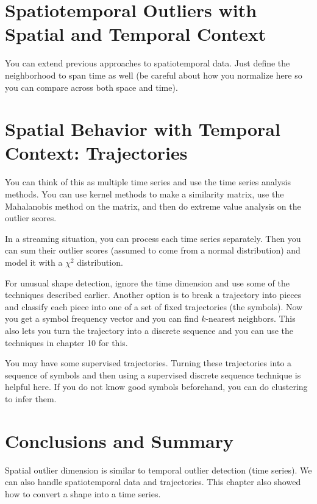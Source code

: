 \documentclass[a4paper]{article}
\begin{document}
\section{Spatiotemporal Outliers with Spatial and Temporal Context}
You can extend previous approaches to spatiotemporal data. Just define the
neighborhood to span time as well (be careful about how you normalize here
so you can compare across both space and time).

\section{Spatial Behavior with Temporal Context: Trajectories}
You can think of this as multiple time series and use the time series analysis
methods. You can use kernel methods to make a similarity matrix, use the
Mahalanobis method on the matrix, and then do extreme value analysis on the
outlier scores.

In a streaming situation, you can process each time series separately. Then you
can sum their outlier scores (assumed to come from a normal distribution) and
model it with a $\chi^2$ distribution.

For unusual shape detection, ignore the time dimension and use some of the
techniques described earlier. Another option is to break a trajectory into
pieces and classify each piece into one of a set of fixed trajectories (the
symbols). Now you get a symbol frequency vector and you can find $k$-nearest
neighbors. This also lets you turn the trajectory into a discrete sequence and
you can use the techniques in chapter 10 for this.

You may have some supervised trajectories. Turning these trajectories into a
sequence of symbols and then using a supervised discrete sequence
technique is helpful here. If you do not know good symbols beforehand, you can
do clustering to infer them.

\section{Conclusions and Summary}
Spatial outlier dimension is similar to temporal outlier detection (time
series). We can also handle spatiotemporal data and trajectories. This chapter
also showed how to convert a shape into a time series.
\end{document}
